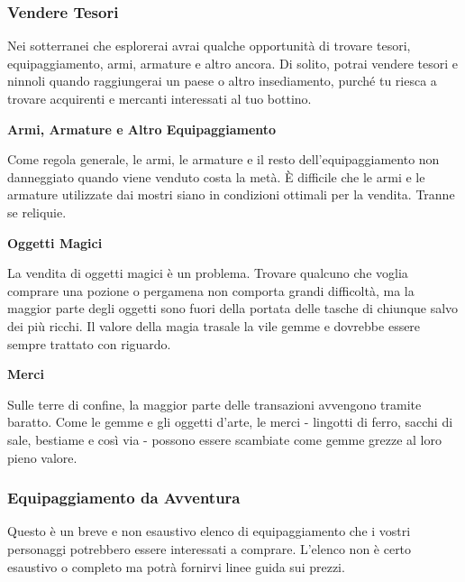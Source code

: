\documentclass[12pt,a4paper,twoside,openany]{book}
\begin{document}
\begin{multicols}{2}

\subsubsection{Vendere Tesori}

Nei sotterranei che esplorerai avrai qualche opportunità di trovare tesori, equipaggiamento, armi, armature e altro ancora. Di solito, potrai vendere tesori e ninnoli quando raggiungerai un paese o altro insediamento, purché tu riesca a trovare acquirenti e mercanti interessati al tuo bottino.

\medskip

\textbf{Armi, Armature e Altro Equipaggiamento }

Come regola generale, le armi, le armature e il resto dell’equipaggiamento non danneggiato quando viene venduto costa la metà. È difficile che le armi e le armature utilizzate dai mostri siano in condizioni ottimali per la vendita. Tranne se reliquie.

\medskip

\textbf{Oggetti Magici}

La vendita di oggetti magici è un problema. Trovare qualcuno che voglia comprare una pozione o pergamena non comporta grandi difficoltà, ma la maggior parte degli oggetti sono fuori della portata delle tasche di chiunque salvo dei più ricchi. Il valore della magia trasale la vile gemme e dovrebbe essere sempre trattato con riguardo.

\medskip

\textbf{Merci}

Sulle terre di confine, la maggior parte delle transazioni avvengono tramite baratto. Come le gemme e gli oggetti d’arte, le merci - lingotti di ferro, sacchi di sale, bestiame e così via - possono essere scambiate come gemme grezze al loro pieno valore.


\subsubsection{Equipaggiamento da Avventura}

Questo è un breve e non esaustivo elenco di equipaggiamento che i vostri personaggi potrebbero essere interessati a comprare. L'elenco non è certo esaustivo o completo ma potrà fornirvi linee guida sui prezzi.


\end{multicols}
\end{document}
